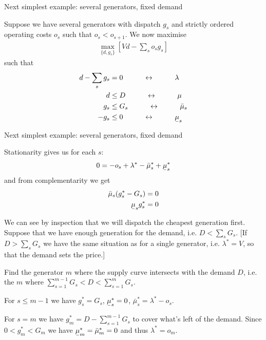 \documentclass[10pt,dvipsnames]{beamer}
\def\l{\lambda}
\def\m{\mu}
\newcommand{\ubar}[1]{\text{\b{$#1$}}}
\begin{document}
\begin{frame}{Next simplest example: several generators, fixed demand}

  Suppose we have several generators with dispatch $g_s$ and strictly ordered
  operating costs $o_s$ such that $o_s < o_{s+1}$. We now maximise
  \begin{align*}
    \max_{\{d, g_s\}}  \left[ Vd  -  \sum_s o_s g_s \right]
  \end{align*}
  such that
  \begin{align*}
    d -  \sum_s g_s  & = 0 \hspace{1cm} \leftrightarrow \hspace{1cm} \l \\
    d & \leq D  \hspace{1cm} \leftrightarrow \hspace{1cm} \m \\
        g_s  & \leq  G_s  \hspace{1cm}\leftrightarrow\hspace{1cm} \bar{\m}_s \\
    - g_s  & \leq  0  \hspace{1cm}\leftrightarrow\hspace{1cm} \ubar{\m}_s
  \end{align*}


\end{frame}

\begin{frame}{Next simplest example: several generators, fixed demand}

  Stationarity gives us for each $s$:
  \begin{align*}
    0 = -o_s + \l^* - \bar{\m}^*_s + \ubar{\m}^*_s
  \end{align*}
  and from complementarity we get
  \begin{align*}
    \bar{\m}_s(g_s^* - G_s) & = 0 \\
    \ubar{\m}_sg_s^* & = 0
  \end{align*}

  We can see by inspection that we will dispatch the cheapest
  generation first. Suppose that we have enough generation for the
  demand, i.e. $D < \sum_s G_s$. [If $D > \sum_s G_s$ we have the same
    situation as for a single generator, i.e. $\l^* = V$, so that the demand sets the price.]

  Find the generator $m$ where the supply curve intersects with the demand $D$, i.e. the $m$ where $\sum_{s=1}^{m-1} G_s < D < \sum_{s=1}^{m}
  G_s$.

  For $s \leq m-1$ we have $g_s^* = G_s$, $\ubar{\m}^*_s = 0$,
  $\bar{\m}^*_s =  \l^* - o_s$.

  For $s = m$ we have $g_m^* = D - \sum_{s=1}^{m-1} G_s$ to cover
  what's left of the demand. Since $0 < g_m^* < G_m$ we have
  $\ubar{\m}^*_m = \bar{\m}^*_m = 0$ and thus $\l^* = o_m$.


\end{frame}
\end{document}
